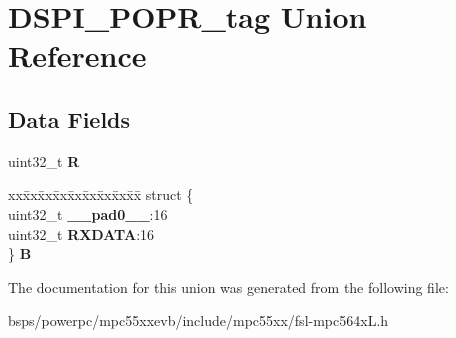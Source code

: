 \hypertarget{unionDSPI__POPR__tag}{}\section{D\+S\+P\+I\+\_\+\+P\+O\+P\+R\+\_\+tag Union Reference}
\label{unionDSPI__POPR__tag}
\subsection*{Data Fields}
\begin{DoxyCompactItemize}
\item 
\mbox{\label{unionDSPI__POPR__tag_a0885806a00bdf762bbb26817d60c1b40}} 
uint32\+\_\+t {\bfseries R}
\item 
\mbox{\label{unionDSPI__POPR__tag_af0e3ef58ff22c3b072a6167850bb3c0a}} 
\begin{tabbing}
xx\=xx\=xx\=xx\=xx\=xx\=xx\=xx\=xx\=\kill
struct \{\\
\>uint32\_t {\bfseries \_\_pad0\_\_}:16\\
\>uint32\_t {\bfseries RXDATA}:16\\
\} {\bfseries B}\\

\end{tabbing}\end{DoxyCompactItemize}


The documentation for this union was generated from the following file\+:\begin{DoxyCompactItemize}
\item 
bsps/powerpc/mpc55xxevb/include/mpc55xx/fsl-\/mpc564x\+L.\+h\end{DoxyCompactItemize}
